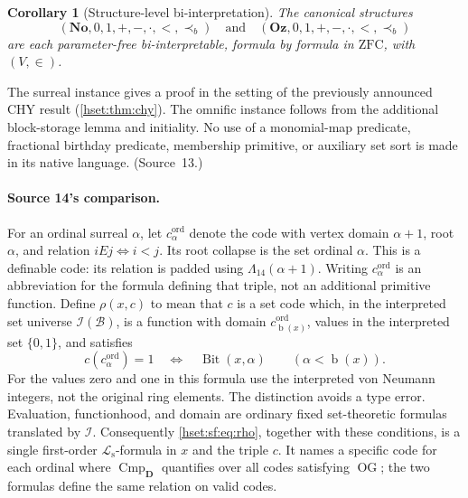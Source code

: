 \documentclass[11pt,letterpaper]{article}
\newtheorem{corollary}[corollary]{Corollary}\aliascntresetthe{corollary}
\theoremstyle{definition}
\theoremstyle{remark}
\newcommand{\No}{\mathbf{No}}
\newcommand{\bd}{\operatorname{b}}
\newcommand{\B}{\mathcal B}
\newcommand{\I}{\mathcal I}
\newcommand{\Bit}{\operatorname{Bit}}
\newcommand{\ZFC}{\mathrm{ZFC}}
\newcommand{\Oz}{\mathbf{Oz}}
\newcommand{\precb}{\prec_b}
\newcommand{\OG}{\operatorname{OG}}
\newcommand{\Cmp}{\operatorname{Cmp}}
\newcommand{\Dd}{\mathbf{D}}
\newcommand{\Ls}{\mathcal L_{\mathrm s}}
\begin{document}
\begin{corollary}[Structure-level bi-interpretation]\label{hset:sf:cor:structure}
The canonical structures
\[
 (\No,0,1,+,-,\cdot,<,\precb)\quad\text{and}\quad(\Oz,0,1,+,-,\cdot,<,\precb)
\]
are each parameter-free bi-interpretable, formula by formula in $\ZFC$, with
$(V,\in)$.
\end{corollary}

The surreal instance gives a proof in the setting of the previously announced CHY
result (\cref{hset:thm:chy}). The omnific instance follows from the additional
block-storage lemma and initiality. No use of a monomial-map predicate,
fractional birthday predicate, membership primitive, or auxiliary set sort is made
in its native language. (Source~13.)

\paragraph{Source 14's comparison.} For an ordinal surreal $\alpha$, let
$c^{\mathrm{ord}}_\alpha$ denote the code with vertex domain $\alpha+1$, root
$\alpha$, and relation $iEj\iff i<j$. Its root collapse is the set ordinal
$\alpha$. This is a definable code: its relation is padded using
$\Lambda_{14}(\alpha+1)$. Writing $c^{\mathrm{ord}}_\alpha$ is an abbreviation
for the formula defining that triple, not an additional primitive function.
Define $\rho(x,c)$ to mean that $c$ is a set code which, in the interpreted set
universe $\I(\B)$, is a function with domain $c^{\mathrm{ord}}_{\bd(x)}$, values
in the interpreted set $\{0,1\}$, and satisfies
\begin{equation}\label{hset:sf:eq:rho}
 c(c^{\mathrm{ord}}_\alpha)=1\quad\Longleftrightarrow\quad\Bit(x,\alpha)
 \qquad(\alpha<\bd(x)).
\end{equation}
For the values zero and one in this formula use the interpreted von Neumann
integers, not the original ring elements. The distinction avoids a type error.
Evaluation, functionhood, and domain are ordinary fixed set-theoretic formulas
translated by $\I$. Consequently \eqref{hset:sf:eq:rho}, together with these
conditions, is a single first-order $\Ls$-formula in $x$ and the triple $c$. It
names a specific code for each ordinal where $\Cmp_{\Dd}$ quantifies over all
codes satisfying $\OG$; the two formulas define the same relation on valid codes.
\end{document}
